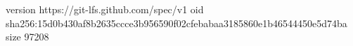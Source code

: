 version https://git-lfs.github.com/spec/v1
oid sha256:15d0b430af8b2635ccce3b956590f02cfebabaa3185860e1b46544450e5d74ba
size 97208
